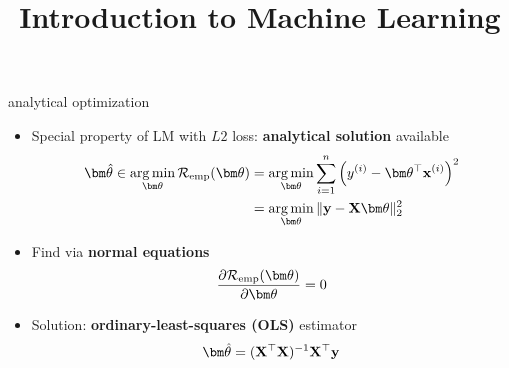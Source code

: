 \documentclass[11pt,compress,t,notes=noshow, xcolor=table]{beamer}
\title{Introduction to Machine Learning}
\begin{document}



\begin{vbframe}{analytical optimization}

\begin{itemize}
    \item Special property of LM with $L2$ loss: \textbf{analytical solution}
    available
    \begin{align*}
        \thetavh \in 
        \argmin_{\thetav} \risket &=
        \argmin_{\thetav} \sumin \left(\yi - \thetav^\top \xi \right)^2  \\
        &= \argmin_{\thetav} \| \yv - \Xmat \thetav \|^2_2
    \end{align*}
    \normalsize
    \item Find via \textbf{normal equations}
    $$\pd{\risket}{\thetav} = 0$$
    \item Solution: \textbf{ordinary-least-squares (OLS)} estimator
    $$\thetavh = \olsest$$
\end{itemize}

\end{vbframe}

\end{document}
